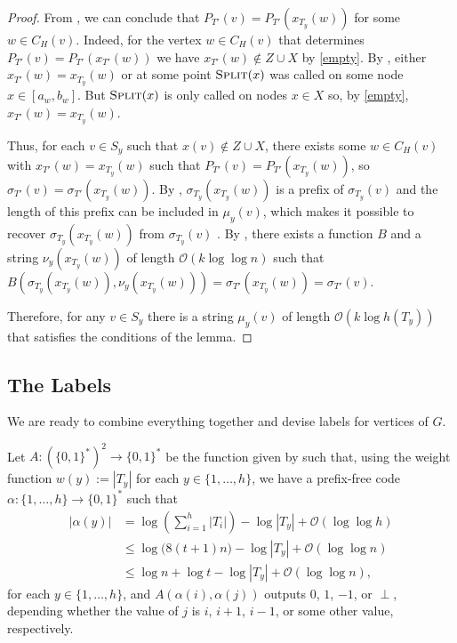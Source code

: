 \documentclass[kpfonts]{patmorin}
\newcommand{\Oh}{\mathcal{O}}
\let\leq\leqslant
\begin{document}
\begin{proof}
  From , we can conclude that $P_{T'}(v)=P_{T'}(x_{T_y}(w))$ for some $w\in C_H(v)$.  Indeed, for the vertex $w\in C_H(v)$ that determines $P_{T'}(v)=P_{T'}(x_{T'}(w))$ we have $x_{T'}(w)\not\in Z\cup X$ by \eqref{empty}. By , either $x_{T'}(w)=x_{T_y}(w)$ or at some point $\textsc{Split}(x)$ was called on some node $x\in[a_w,b_w]$.  But $\textsc{Split}(x)$ is only called on nodes $x\in X$ so, by \eqref{empty}, $x_{T'}(w)=x_{T_y}(w)$.

  Thus, for each $v\in S_y$ such that $x(v)\not\in Z\cup X$, there exists some $w\in C_H(v)$ with $x_{T'}(w)=x_{T_y}(w)$ such that $P_{T'}(v)=P_{T'}(x_{T_y}(w))$, so $\sigma_{T'}(v)=\sigma_{T'}(x_{T_y}(w))$.  By , $\sigma_{T_y}(x_{T_y}(w))$ is a prefix of $\sigma_{T_y}(v)$ and the length of this prefix can be included in $\mu_y(v)$, which makes it possible to recover $\sigma_{T_y}(x_{T_y}(w))$ from $\sigma_{T_y}(v)$ .  By , there exists a function $B$ and a string $\nu_y(x_{T_y}(w))$ of length $\Oh(k\log\log n)$ such that $B(\sigma_{T_y}(x_{T_y}(w)), \nu_y(x_{T_y}(w))) = \sigma_{T'}(x_{T_y}(w)) = \sigma_{T'}(v)$.

  Therefore, for any $v\in S_y$ there is a string $\mu_y(v)$ of length $\Oh(k\log h(T_y))$ that satisfies the conditions of the lemma.
\end{proof}

\subsection{The Labels}

We are ready to combine everything together and devise labels for vertices of $G$.

Let $A:(\{0,1\}^{*})^2\to\{0,1\}^*$ be the function given by  such that, 
using the weight function $w(y):=|T_y|$ for each $y\in\{1,\ldots,h\}$,
we have a prefix-free code $\alpha:\{1,\ldots,h\}\to\{0,1\}^*$ such that
\begin{align*}
|\alpha(y)|&=\log\left(\textstyle\sum_{i=1}^h|T_i|\right) - \log|T_y| + \Oh(\log\log h)\\
&\leq \log\bigl( 8(t+1)n\bigr) - \log|T_y| + \Oh(\log\log n)\\
&\leq \log n + \log t -\log|T_y| + \Oh(\log\log n),
\end{align*}
for each $y\in\{1,\ldots,h\}$, and $A(\alpha(i),\alpha(j))$ outputs $0$, $1$, $-1$, or $\perp$, depending whether the value of $j$ is $i$, $i+1$, $i-1$, or some other value, respectively.
\end{document}
